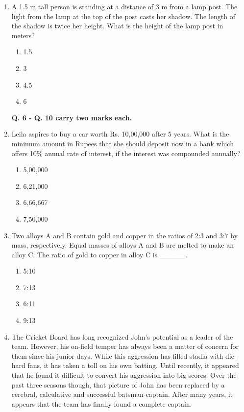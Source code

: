 \documentclass{article}
\begin{document}
\begin{enumerate}
\item A 1.5 m tall person is standing at a distance of 3 m from a lamp post. The light from the lamp at the top of the post casts her shadow. The length of the shadow is twice her height. What is the height of the lamp post in meters?
\begin{multicols}{4}
\begin{enumerate}
\item 1.5
\item 3
\item 4.5
\item 6
\end{enumerate}
\end{multicols}

\textbf{Q. 6 - Q. 10 carry two marks each.}

\item Leila aspires to buy a car worth Rs. 10,00,000 after 5 years. What is the minimum amount in Rupees that she should deposit now in a bank which offers 10\% annual rate of interest, if the interest was compounded annually?
\begin{multicols}{4}
\begin{enumerate}
\item 5,00,000
\item 6,21,000
\item 6,66,667
\item 7,50,000
\end{enumerate}
\end{multicols}

\item Two alloys A and B contain gold and copper in the ratios of 2:3 and 3:7 by mass, respectively. Equal masses of alloys A and B are melted to make an alloy C. The ratio of gold to copper in alloy C is \_\_\_\_\_.
\begin{multicols}{4}
\begin{enumerate}
\item 5:10
\item 7:13
\item 6:11
\item 9:13
\end{enumerate}
\end{multicols}

\item The Cricket Board has long recognized John's potential as a leader of the team. However, his on-field temper has always been a matter of concern for them since his junior days. While this aggression has filled stadia with die-hard fans, it has taken a toll on his own batting. Until recently, it appeared that he found it difficult to convert his aggression into big scores. Over the past three seasons though, that picture of John has been replaced by a cerebral, calculative and successful batsman-captain. After many years, it appears that the team has finally found a complete captain.


\end{enumerate}
\end{document}
